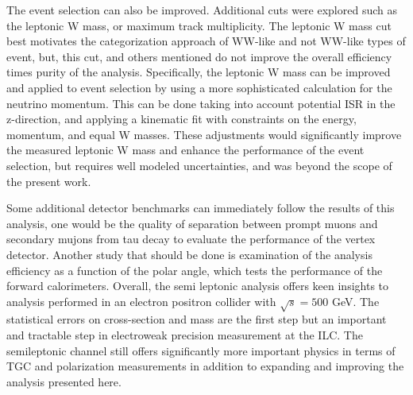 The event selection can also be improved. Additional cuts were explored such as the leptonic W mass, or maximum track multiplicity. The leptonic W mass cut best motivates the categorization approach of WW-like and not WW-like types of event, but, this cut, and others mentioned do not improve the overall efficiency times purity of the analysis.  Specifically, the leptonic W mass can be improved and applied to event selection by using a more sophisticated calculation for the neutrino momentum. This can be done taking into account potential ISR in the z-direction, and applying a kinematic fit with constraints on the energy, momentum, and equal W masses. These adjustments would significantly improve the measured leptonic W mass and enhance the performance of the event selection, but requires well modeled uncertainties, and was beyond the scope of the present work. 
 
Some additional detector benchmarks can immediately follow the results of this analysis, one would be the quality of separation between prompt muons and secondary mujons from tau decay to evaluate the performance of the vertex detector. Another study that should be done is examination of the analysis efficiency as a function of the polar angle, which tests the performance of the forward calorimeters.  Overall, the semi leptonic analysis offers keen insights to analysis performed in an electron positron collider with $\sqrt{s} = 500$ GeV. The statistical errors on cross-section and mass are the first step but an important and tractable step in electroweak precision measurement at the ILC.  The semileptonic channel still offers significantly more important physics in terms of TGC and polarization measurements in addition to expanding and improving the analysis presented here. 